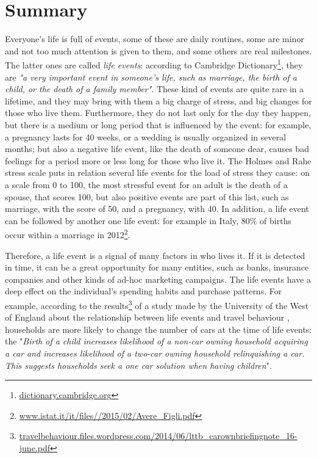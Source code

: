 \chapter*{Summary} %
\label{summary}
Everyone's life is full of events, some of these are daily routines, some are minor and not too much attention is given to them, and some others are real milestones. The latter ones are called \emph{life events}: according to Cambridge Dictionary\footnote{\url{dictionary.cambridge.org}}, they are \textit{"a very important event in someone's life, such as marriage, the birth of a child, or the death of a family member"}. These kind of events are quite rare in a lifetime, and they may bring with them a big charge of stress, and big changes for those who live them. Furthermore, they do not last only for the day they happen, but there is a medium or long period that is influenced by the event: for example, a pregnancy lasts for 40 weeks, or a wedding is usually organized in several months; but also a negative life event, like the death of someone dear, causes bad feelings for a period more or less long for those who live it. The Holmes and Rahe stress scale \cite{holmes1967social} puts in relation several life events for the load of stress they cause: on a scale from 0 to 100, the most stressful event for an adult is the death of a spouse, that scores 100, but also positive events are part of this list, such as marriage, with the score of 50, and a pregnancy, with 40. In addition, a life event can be followed by another one life event: for example in Italy, 80\% of births occur within a marriage in 2012\footnote{\url{www.istat.it/it/files//2015/02/Avere_Figli.pdf}}.

Therefore, a life event is a signal of many factors in who lives it. If it is detected in time, it can be a great opportunity for many entities, such as banks, insurance companies and other kinds of ad-hoc marketing campaigns. The life events have a deep effect on the individual's spending habits and purchase patterns. For example, according to the results\footnote{\url{travelbehaviour.files.wordpress.com/2014/06/lttb_carownbriefingnote_16-june.pdf}} of a study made by the University of the West of England about the relationship between life events and travel behaviour \cite{chatterjee2015facts}, households are more likely to change the number of cars at the time of life events: the "\textit{Birth of a child increases likelihood of a non-car owning household acquiring a car and increases likelihood of a two-car owning household relinquishing a car. This suggests households seek a one car solution when having children}".

